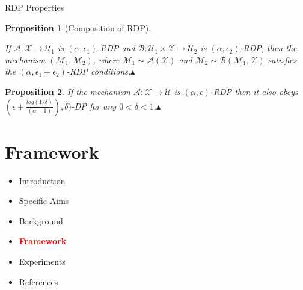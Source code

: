 \documentclass{beamer}
\newtheorem{proposition}{Proposition}
\begin{document}
\begin{frame}{RDP Properties}

 \begin{proposition}[Composition of RDP]\label{def:rdp-p1}
 
 If $\mathcal{A}: \mathcal{X} \rightarrow \mathcal{U}_1$ is $(\alpha,\epsilon_{1})$-RDP and $\mathcal{B}: \mathcal{U}_1 \times \mathcal{X} \rightarrow \mathcal{U}_2$ is $(\alpha,\epsilon_{2})$-RDP, then the mechanism $(\mathcal{M}_1,\mathcal{M}_2) $, where $\mathcal{M}_1 \sim \mathcal{A}(\mathcal{X})$ and $\mathcal{M}_2 \sim \mathcal{B}(\mathcal{M}_1,\mathcal{X})$ satisfies the $(\alpha,\epsilon_{1}+\epsilon_{2})$-RDP conditions.$\blacktriangle$

\end{proposition}

 \begin{proposition}\label{def:rdp-p2}
 If the mechanism $\mathcal{A}: \mathcal{X} \rightarrow \mathcal{U}$ is $(\alpha,\epsilon)$-RDP then it also obeys $(\epsilon + \frac{log(1/\delta)}{(\alpha-1)}),\delta)$-DP for any $0 < \delta < 1$.$\blacktriangle$

\end{proposition}


\end{frame} 



\section{Framework}

\begin{frame}{}
\begin{itemize}
  \item Introduction
  \item Specific Aims
  \item Background
  \item \textcolor{red}{\textbf{Framework}}
  \item Experiments
  \item References
  
\end{itemize}
\end{frame}
\end{document}
